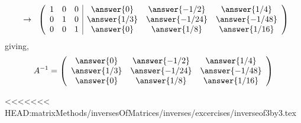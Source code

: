\documentclass{ximera}
\begin{document}
\begin{exercise}
\begin{prompt}
\[\]
\[
\hspace{.2cm}\rightarrow \hspace{.2cm}
\left(\begin{array}{ccc|ccc}
1 & 0 & 0& \answer{0} & \answer{-1/2} & \answer{1/4}\\
0 & 1 & 0 & \answer{1/3} & \answer{-1/24} & \answer{-1/48}\\
0 & 0 & 1 & \answer{0} & \answer{1/8} & \answer{1/16}
\end{array}\right)
\]
giving,
\[A^{-1}=
\left(\begin{array}{ccc}
 \answer{0} & \answer{-1/2} & \answer{1/4}\\
\answer{1/3} & \answer{-1/24} & \answer{-1/48}\\
 \answer{0} & \answer{1/8} & \answer{1/16}
\end{array}\right)
\]
\end{prompt}
\end{exercise}
















<<<<<<< HEAD:matrixMethods/inversesOfMatrices/inverses/excercises/inverseof3by3.tex
\end{document}
